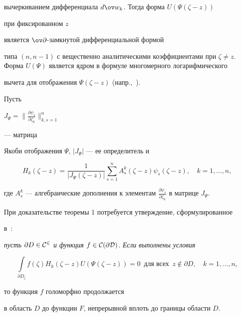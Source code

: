 вычеркиванием дифференциала $d\ov w_k$. Тогда форма $U(\Psi(\zeta-z))$


при фиксированном $z$


является $\ov\partial$-замкнутой дифференциальной формой


типа $(n,n-1)$ с вещественно аналитическими коэффициентами при $\zeta\ne


z$. Форма $U(\Psi)$ является ядром в формуле многомерного логарифмического


вычета для отображения $\Psi(\zeta-z)$ (напр.,~\cite{AU}).





Пусть


$J_{\Psi}=\big\|\frac{\partial\psi_s}{\partial\zeta_k}\big\|_{k,s=1}^{n}$


--- матрица


Якоби отображения $\Psi$,  $|J_{\Psi}|$ --- ее определитель и


\begin{equation}\label{21}


H_k(\zeta-z)=\frac1{|J_{\Psi}(\zeta-z)|}\sum_{s=1}^{n}A_s^k(\zeta-z)\psi_s


(\zeta-z), \quad k=1,\dotsc,n,


\end{equation}


где $A_s^k$ --- алгебраические дополнения к элементам $\frac{\partial\psi_s}


{\partial\zeta_k}$ в матрице $J_{\Psi}$.





При доказательстве теоремы 1 потребуется утверждение, сформулированное


в~\cite{M}:


{\it пусть $\partial D\in\cal{C}^2$ и функция $f\in\cal


{C}(\partial D)$. Если выполнены условия


\begin{equation}\label{3}


\int\limits_{\partial D_{\zeta}}f(\zeta)H_k(\zeta-z)U(\Psi(\zeta-z))=0\ \;


\text{для всех}\ \; z\notin\partial D,\quad k=1,\dotsc,n,


\end{equation}


то функция $f$ голоморфно продолжается


в область $D$ до функции $F$, непрерывной вплоть до границы области $D$.}





